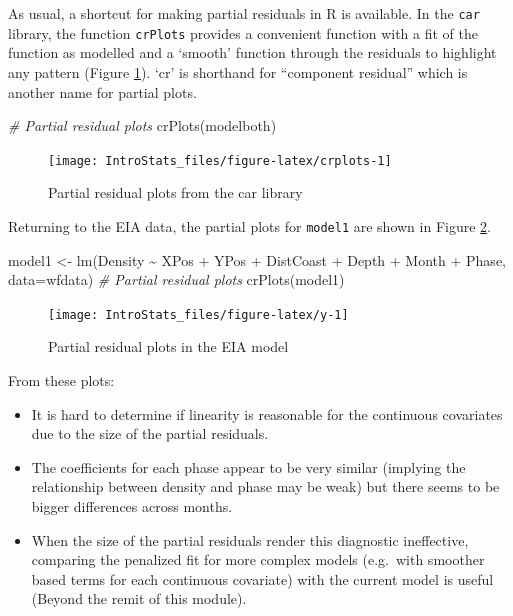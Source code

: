 \documentclass[
  oneside]{krantz}
\newenvironment{Shaded}{\begin{snugshade}}{\end{snugshade}}
\newcommand{\AttributeTok}[1]{\textcolor[rgb]{0.77,0.63,0.00}{#1}}
\newcommand{\CommentTok}[1]{\textcolor[rgb]{0.56,0.35,0.01}{\textit{#1}}}
\newcommand{\FunctionTok}[1]{\textcolor[rgb]{0.00,0.00,0.00}{#1}}
\newcommand{\NormalTok}[1]{#1}
\newcommand{\OtherTok}[1]{\textcolor[rgb]{0.56,0.35,0.01}{#1}}
\newcommand{\SpecialCharTok}[1]{\textcolor[rgb]{0.00,0.00,0.00}{#1}}
\providecommand{\tightlist}{%
  \setlength{\itemsep}{0pt}\setlength{\parskip}{0pt}}
\begin{document}
As usual, a shortcut for making partial residuals in R is available. In the \texttt{car} library, the function \texttt{crPlots} provides a convenient function with a fit of the function as modelled and a `smooth' function through the residuals to highlight any pattern (Figure \ref{fig:crplots}). `cr' is shorthand for ``component residual'' which is another name for partial plots.

\begin{Shaded}
\begin{Highlighting}[]
\CommentTok{\# Partial residual plots}
\FunctionTok{crPlots}\NormalTok{(modelboth)}
\end{Highlighting}
\end{Shaded}

\begin{figure}

{\centering \texttt{[image: IntroStats\_files/figure-latex/crplots-1]} 

}

\caption{Partial residual plots from the car library}\label{fig:crplots}
\end{figure}

Returning to the EIA data, the partial plots for \texttt{model1} are shown in Figure \ref{fig:y}.

\begin{Shaded}
\begin{Highlighting}[]
\NormalTok{model1 }\OtherTok{\textless{}{-}} \FunctionTok{lm}\NormalTok{(Density }\SpecialCharTok{\textasciitilde{}}\NormalTok{ XPos }\SpecialCharTok{+}\NormalTok{ YPos }\SpecialCharTok{+}\NormalTok{ DistCoast }\SpecialCharTok{+}\NormalTok{ Depth }\SpecialCharTok{+} 
\NormalTok{                Month }\SpecialCharTok{+}\NormalTok{ Phase, }\AttributeTok{data=}\NormalTok{wfdata)}
\CommentTok{\# Partial residual plots}
\FunctionTok{crPlots}\NormalTok{(model1)}
\end{Highlighting}
\end{Shaded}

\begin{figure}

{\centering \texttt{[image: IntroStats\_files/figure-latex/y-1]} 

}

\caption{Partial residual plots in the EIA model}\label{fig:y}
\end{figure}

From these plots:

\begin{itemize}
\tightlist
\item
  It is hard to determine if linearity is reasonable for the continuous covariates due to the size of the partial residuals.
\item
  The coefficients for each phase appear to be very similar (implying the relationship between density and phase may be weak) but there seems to be bigger differences across months.
\item
  When the size of the partial residuals render this diagnostic ineffective, comparing the penalized fit for more complex models (e.g.~with smoother based terms for each continuous covariate) with the current model is useful (Beyond the remit of this module).
\end{itemize}
\end{document}
